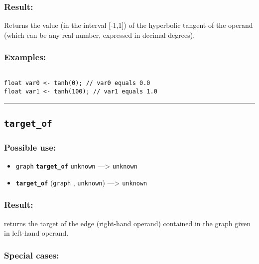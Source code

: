 \documentclass[]{book}
\providecommand{\tightlist}{%
  \setlength{\itemsep}{0pt}\setlength{\parskip}{0pt}}
\theoremstyle{definition}
\theoremstyle{definition}
\theoremstyle{definition}
\theoremstyle{remark}
\begin{document}
\subsubsection{Result:}\label{result-497}

Returns the value (in the interval {[}-1,1{]}) of the hyperbolic tangent
of the operand (which can be any real number, expressed in decimal
degrees).

\subsubsection{Examples:}\label{examples-355}

\begin{verbatim}
 
float var0 <- tanh(0); // var0 equals 0.0 
float var1 <- tanh(100); // var1 equals 1.0
\end{verbatim}

\begin{center}\rule{0.5\linewidth}{\linethickness}\end{center}

\subsection{\texorpdfstring{\texttt{target\_of}}{target\_of}}\label{target_of}

\subsubsection{Possible use:}\label{possible-use-515}

\begin{itemize}
\tightlist
\item
  \texttt{graph} \textbf{\texttt{target\_of}} \texttt{unknown}
  ---\textgreater{} \texttt{unknown}
\item
  \textbf{\texttt{target\_of}} (\texttt{graph} , \texttt{unknown})
  ---\textgreater{} \texttt{unknown}
\end{itemize}

\subsubsection{Result:}\label{result-498}

returns the target of the edge (right-hand operand) contained in the
graph given in left-hand operand.

\subsubsection{Special cases:}\label{special-cases-135}
\end{document}
